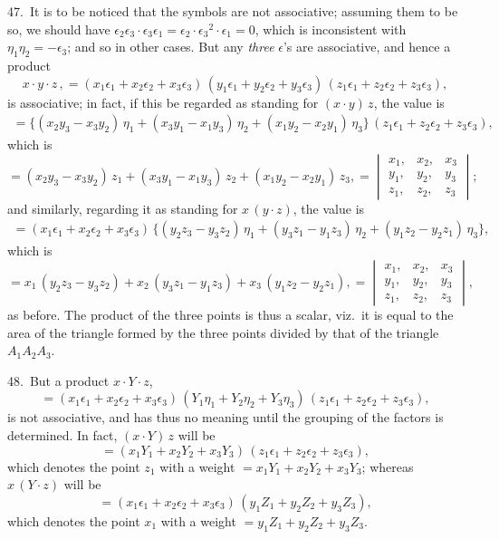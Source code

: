 \documentclass[11pt,a4paper]{book}
\begin{document}
47.\ It is to be noticed that the symbols are not associative; assuming them to
be so, we should have $\epsilon_2 \epsilon_3 \cdot \epsilon_3 \epsilon_1 = \epsilon_2 \cdot \epsilon_3{}^2 \cdot \epsilon_1 = 0$,
which is inconsistent with $\eta_1 \eta_2 = -\epsilon_3$; and so in other cases.
But any \textit{three} $\epsilon$'s are associative, and hence a product
\[
x \cdot y \cdot z \,, = (x_1 \epsilon_1 + x_2 \epsilon_2 + x_3 \epsilon_3)
\, (y_1 \epsilon_1 + y_2 \epsilon_2 + y_3 \epsilon_3)
\, (z_1 \epsilon_1 + z_2 \epsilon_2 + z_3 \epsilon_3),
\]
is associative; in fact, if this be regarded as standing for $(x \cdot y) \, z$, the value is
\begin{multline*}
= \{(x_2 y_3 - x_3 y_2)\, \eta_1 + (x_3 y_1 - x_1 y_3)\, \eta_2 + (x_1 y_2 - x_2 y_1)\, \eta_3\}
\, (z_1 \epsilon_1 + z_2 \epsilon_2 + z_3 \epsilon_3),
\end{multline*}
which is
\[
= (x_2 y_3 - x_3 y_2)\, z_1 + (x_3 y_1 - x_1 y_3)\, z_2 + (x_1 y_2 - x_2 y_1)\, z_3,
= \begin{vmatrix}
x_1, & x_2, & x_3 \\
y_1, & y_2, & y_3 \\
z_1, & z_2, & z_3
\end{vmatrix};
\]
and similarly, regarding it as standing for $x \, (y \cdot z)$, the value is
\begin{multline*}
= (x_1 \epsilon_1 + x_2 \epsilon_2 + x_3 \epsilon_3)\,
\{(y_2 z_3 - y_3 z_2)\, \eta_1 + (y_3 z_1 - y_1 z_3)\, \eta_2 + (y_1 z_2 - y_2 z_1)\, \eta_3\},
\end{multline*}
which is
\[
= x_1 \, (y_2 z_3 - y_3 z_2) + x_2 \, (y_3 z_1 - y_1 z_3) + x_3 \, (y_1 z_2 - y_2 z_1),
= \begin{vmatrix}
x_1, & x_2, & x_3 \\
y_1, & y_2, & y_3 \\
z_1, & z_2, & z_3
\end{vmatrix},
\]
as before. The product of the three points is thus a scalar, viz.\ it is equal to the
area of the triangle formed by the three points divided by that of the triangle
$A_1 A_2 A_3$.

48.\ But a product $x \cdot Y \cdot z$,
\[
= (x_1 \epsilon_1 + x_2 \epsilon_2 + x_3 \epsilon_3)\,
(Y_1 \eta_1 + Y_2 \eta_2 + Y_3 \eta_3)\,
(z_1 \epsilon_1 + z_2 \epsilon_2 + z_3 \epsilon_3),
\]
is not associative, and has thus no meaning until the grouping of the factors is
determined. In fact, $(x \cdot Y)\, z$ will be
\[
= (x_1 Y_1 + x_2 Y_2 + x_3 Y_3)\, (z_1 \epsilon_1 + z_2 \epsilon_2 + z_3 \epsilon_3),
\]
which denotes the point $z_1$ with a weight $= x_1 Y_1 + x_2 Y_2 + x_3 Y_3$;
whereas $x \, (Y \cdot z)$ will be
\[
= (x_1 \epsilon_1 + x_2 \epsilon_2 + x_3 \epsilon_3)\,
(y_1 Z_1 + y_2 Z_2 + y_3 Z_3),
\]
which denotes the point $x_1$ with a weight $= y_1 Z_1 + y_2 Z_2 + y_3 Z_3$.
\end{document}
